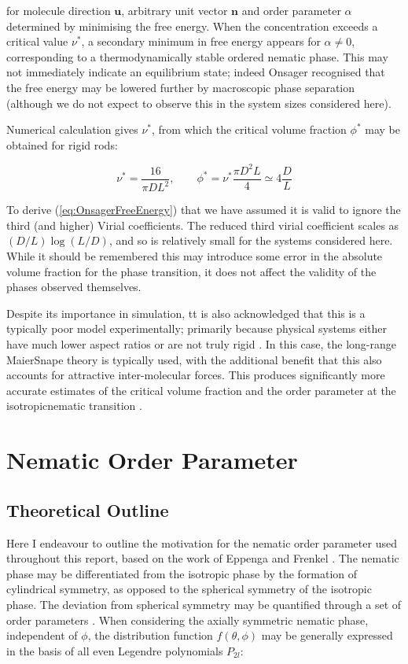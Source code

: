 \documentclass[11pt, a4paper]{article} %
\begin{document}
\begin{appendices}
for molecule direction $\boldsymbol{u}$, arbitrary unit vector $\boldsymbol{n}$ and order parameter $\alpha$ determined by minimising the free energy. When the concentration exceeds a critical value $\nu^{*}$, a secondary minimum in free energy appears for $\alpha \neq 0$, corresponding to a thermodynamically stable ordered nematic phase. This may not immediately indicate an equilibrium state; indeed Onsager recognised that the free energy may be lowered further by macroscopic phase separation (although we do not expect to observe this in the system sizes considered here). 

Numerical calculation gives $\nu^{*}$, from which the critical volume fraction $\phi^{*}$ may be obtained for rigid rods:

\begin{equation}
\nu^{*} = \frac{16}{\pi D L^{2}}, \qquad \phi^{*} = \nu^{*} \frac{\pi D^{2} L}{4} \simeq 4 \frac{D}{L}
\end{equation}


To derive (\ref{eq:OnsagerFreeEnergy}) that we have assumed it is valid to ignore the third (and higher) Virial coefficients. The reduced third virial coefficient scales as $(D/L)\log(L/D)$, and so is relatively small for the systems considered here. While it should be remembered this may introduce some error in the absolute volume fraction for the phase transition, it does not affect the validity of the phases observed themselves.

Despite its importance in simulation, tt is also acknowledged that this is a typically poor model experimentally; primarily because physical systems either have much lower aspect ratios or are not truly rigid \cite{Odijk1985}. In this case, the long-range Maier\textendash Snape theory \cite{Maier1959} is typically used, with the additional benefit that this also accounts for attractive inter-molecular forces. This produces significantly more accurate estimates of the critical volume fraction and the order parameter at the isotropic\textendash nematic transition \cite{Zannoni1979b}.

\section{Nematic Order Parameter} 
\subsection{Theoretical Outline}\label{sec:OrderParamTheory}
Here I endeavour to outline the motivation for the nematic order parameter used throughout this report, based on the work of Eppenga and Frenkel \cite{Eppenga1984, Frenkel1982}. The nematic phase may be differentiated from the isotropic phase by the formation of cylindrical symmetry, as opposed to the spherical symmetry of the isotropic phase. The deviation from spherical symmetry may be quantified through a set of order parameters \cite{Zannoni1979}. When considering the axially symmetric nematic phase, independent of $\phi$, the distribution function $f(\theta, \phi)$ may be generally expressed in the basis of all even Legendre polynomials $P_{2l}$:


\end{appendices}
\end{document}
